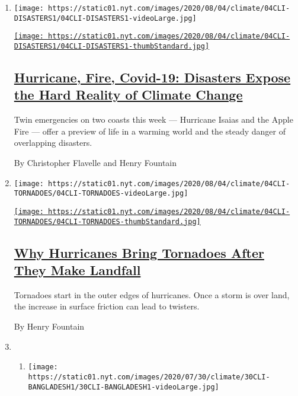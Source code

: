 \begin{enumerate}
\def\labelenumi{\arabic{enumi}.}
\item
  \texttt{[image: https://static01.nyt.com/images/2020/08/04/climate/04CLI-DISASTERS1/04CLI-DISASTERS1-videoLarge.jpg]}

  \href{/2020/08/04/climate/hurricane-isaias-apple-fire-climate.html}{\texttt{[image: https://static01.nyt.com/images/2020/08/04/climate/04CLI-DISASTERS1/04CLI-DISASTERS1-thumbStandard.jpg]}}

  \hypertarget{hurricane-fire-covid-19-disasters-expose-the-hard-reality-of-climate-change}{%
  \subsection{\texorpdfstring{\href{/2020/08/04/climate/hurricane-isaias-apple-fire-climate.html}{Hurricane,
  Fire, Covid-19: Disasters Expose the Hard Reality of Climate
  Change}}{Hurricane, Fire, Covid-19: Disasters Expose the Hard Reality of Climate Change}}\label{hurricane-fire-covid-19-disasters-expose-the-hard-reality-of-climate-change}}

  Twin emergencies on two coasts this week --- Hurricane Isaias and the
  Apple Fire --- offer a preview of life in a warming world and the
  steady danger of overlapping disasters.

  By Christopher Flavelle and Henry Fountain
\item
  \texttt{[image: https://static01.nyt.com/images/2020/08/04/climate/04CLI-TORNADOES/04CLI-TORNADOES-videoLarge.jpg]}

  \href{/2020/08/04/climate/hurricanes-tornadoes.html}{\texttt{[image: https://static01.nyt.com/images/2020/08/04/climate/04CLI-TORNADOES/04CLI-TORNADOES-thumbStandard.jpg]}}

  \hypertarget{why-hurricanes-bring-tornadoes-after-they-make-landfall}{%
  \subsection{\texorpdfstring{\href{/2020/08/04/climate/hurricanes-tornadoes.html}{Why
  Hurricanes Bring Tornadoes After They Make
  Landfall}}{Why Hurricanes Bring Tornadoes After They Make Landfall}}\label{why-hurricanes-bring-tornadoes-after-they-make-landfall}}

  Tornadoes start in the outer edges of hurricanes. Once a storm is over
  land, the increase in surface friction can lead to twisters.

  By Henry Fountain
\item
  \begin{enumerate}
  \def\labelenumii{\arabic{enumii}.}
  \item
    \texttt{[image: https://static01.nyt.com/images/2020/07/30/climate/30CLI-BANGLADESH1/30CLI-BANGLADESH1-videoLarge.jpg]}


\end{enumerate}
\end{enumerate}
